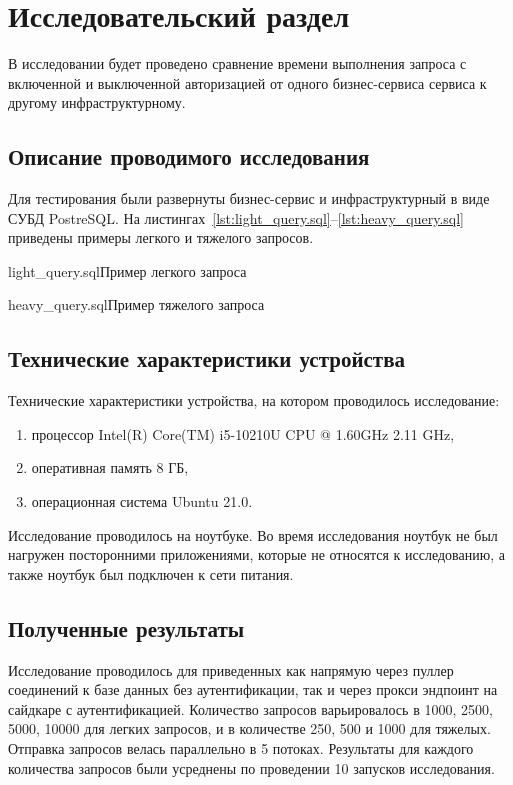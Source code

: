 \chapter{Исследовательский раздел}

В исследовании будет проведено сравнение времени выполнения запроса с включенной и выключенной авторизацией от одного бизнес-сервиса сервиса к другому инфраструктурному.

\section{Описание проводимого исследования}
Для тестирования были развернуты бизнес-сервис и инфраструктурный в виде СУБД PostreSQL.
На листингах~\ref{lst:light_query.sql}--\ref{lst:heavy_query.sql} приведены примеры легкого и тяжелого запросов.

	{light_query.sql}{Пример легкого запроса}
	
	{heavy_query.sql}{Пример тяжелого запроса}

\section{Технические характеристики устройства}

Технические характеристики устройства, на котором проводилось исследование:
\begin{enumerate}
\item процессор Intel(R) Core(TM) i5-10210U CPU @ 1.60GHz 2.11 GHz,
\item оперативная память 8 ГБ,
\item операционная система Ubuntu 21.0.
\end{enumerate}

Исследование проводилось на ноутбуке. Во время исследования ноутбук не был нагружен посторонними приложениями, которые не относятся к исследованию, а также ноутбук был подключен к сети питания.

\section{Полученные результаты}
Исследование проводилось для приведенных как напрямую через пуллер соединений к базе данных без аутентификации, так и через прокси эндпоинт на сайдкаре с аутентификацией. Количество запросов варьировалось в 1000, 2500, 5000, 10000 для легких запросов, и в количестве 250, 500 и 1000 для тяжелых.
Отправка запросов велась параллельно в 5 потоках. Результаты для каждого количества запросов были усреднены по проведении 10 запусков исследования.


